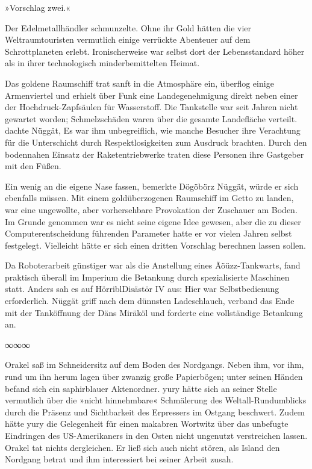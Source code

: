 »Vorschlag zwei.«


Der Edelmetallhändler schmunzelte. Ohne ihr Gold hätten die vier Weltraumtouristen vermutlich einige verrückte Abenteuer auf dem Schrottplaneten erlebt. Ironischerweise war selbst dort der Lebensstandard höher als in ihrer technologisch minderbemittelten Heimat.

Das goldene Raumschiff trat sanft in die Atmosphäre ein, überflog einige Armenviertel und erhielt über Funk eine Landegenehmigung direkt neben einer der Hochdruck-Zapfsäulen für Wasserstoff. Die Tankstelle war seit Jahren nicht gewartet worden; Schmelzschäden waren über die gesamte Landefläche verteilt.  dachte Nüggät,  Es war ihm unbegreiflich, wie manche Besucher ihre Verachtung für die Unterschicht durch Respektlosigkeiten zum Ausdruck brachten. Durch den bodennahen Einsatz der Raketentriebwerke traten diese Personen ihre Gastgeber mit den Füßen.

Ein wenig an die eigene Nase fassen, bemerkte Dögöbörz Nüggät, würde er sich ebenfalls müssen. Mit einem goldüberzogenen Raumschiff im Getto zu landen, war eine ungewollte, aber vorhersehbare Provokation der Zuschauer am Boden. Im Grunde genommen war es nicht seine eigene Idee gewesen, aber die zu dieser Computerentscheidung führenden Parameter hatte er vor vielen Jahren selbst festgelegt. Vielleicht hätte er sich einen dritten Vorschlag berechnen lassen sollen.

Da Roboterarbeit günstiger war als die Anstellung eines Äöüzz-Tankwarts, fand praktisch überall im Imperium die Betankung durch spezialisierte Maschinen statt. Anders sah es auf HörriblDisästör IV aus: Hier war Selbstbedienung erforderlich. Nüggät griff nach dem dünnsten Ladeschlauch, verband das Ende mit der Tanköffnung der Däns Miräköl und forderte eine vollständige Betankung an.

\begin{center}
∞∞∞
\end{center}

Orakel saß im Schneidersitz auf dem Boden des Nordgangs. Neben ihm, vor ihm, rund um ihn herum lagen über zwanzig große Papierbögen; unter seinen Händen befand sich ein saphirblauer Aktenordner. yury hätte sich an seiner Stelle vermutlich über die »nicht hinnehmbare« Schmälerung des Weltall-Rundumblicks durch die Präsenz und Sichtbarkeit des Erpressers im Ostgang beschwert. Zudem hätte yury die Gelegenheit für einen makabren Wortwitz über das unbefugte Eindringen des US-Amerikaners in den Osten nicht ungenutzt verstreichen lassen. Orakel tat nichts dergleichen. Er ließ sich auch nicht stören, als Island den Nordgang betrat und ihm interessiert bei seiner Arbeit zusah.

